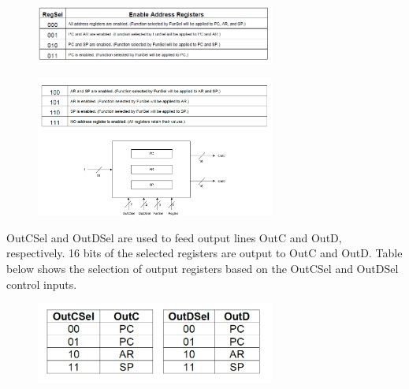 \documentclass[pdftex,12pt,a4paper]{article}
\begin{document}
\begin{figure}[htbp]
	\centering
	\includegraphics[width=0.7\textwidth]{Part 2.3 t1}
\end{figure} 
\begin{figure}[htbp]
	\centering
	\includegraphics[width=0.7\textwidth]{Part 2.3 t2}
\end{figure} 
OutCSel and OutDSel are used to feed output lines OutC and OutD, respectively. 16 bits of the selected registers are output to OutC and OutD. Table below shows the selection of output registers based on the OutCSel and OutDSel control inputs.
\begin{figure}[H]
	\centering
	\includegraphics[width=0.7\textwidth]{Part 2.3 t3}
\end{figure} 
\end{document}
